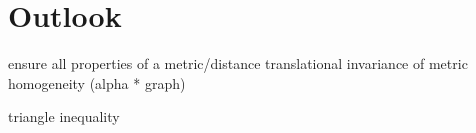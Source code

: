 \section{Outlook}

ensure all properties of a metric/distance
translational invariance of metric
homogeneity (alpha * graph)

triangle inequality
